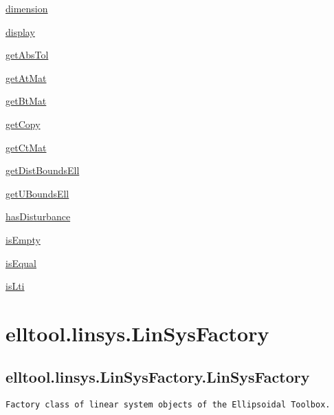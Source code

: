\begin{list}{}{}
 \item \hyperref[method:elltool.linsys.ALinSys.dimension]{dimension}
 \item \hyperref[method:elltool.linsys.ALinSys.display]{display}
 \item \hyperref[method:elltool.linsys.ALinSys.getAbsTol]{getAbsTol}
 \item \hyperref[method:elltool.linsys.ALinSys.getAtMat]{getAtMat}
 \item \hyperref[method:elltool.linsys.ALinSys.getBtMat]{getBtMat}
 \item \hyperref[method:elltool.linsys.ALinSys.getCopy]{getCopy}
 \item \hyperref[method:elltool.linsys.ALinSys.getCtMat]{getCtMat}
 \item \hyperref[method:elltool.linsys.ALinSys.getDistBoundsEll]{getDistBoundsEll}
 \item \hyperref[method:elltool.linsys.ALinSys.getUBoundsEll]{getUBoundsEll}
 \item \hyperref[method:elltool.linsys.ALinSys.hasDisturbance]{hasDisturbance}
 \item \hyperref[method:elltool.linsys.ALinSys.isEmpty]{isEmpty}
 \item \hyperref[method:elltool.linsys.ALinSys.isEqual]{isEqual}
 \item \hyperref[method:elltool.linsys.ALinSys.isLti]{isLti}
\end{list}
\section{elltool.linsys.LinSysFactory}\label{secClassDescr:elltool.linsys.LinSysFactory}
\subsection{\texorpdfstring{elltool.linsys.LinSysFactory.LinSysFactory}{LinSysFactory}}\label{method:elltool.linsys.LinSysFactory.LinSysFactory}
\begin{verbatim}
Factory class of linear system objects of the Ellipsoidal Toolbox.
\end{verbatim}
